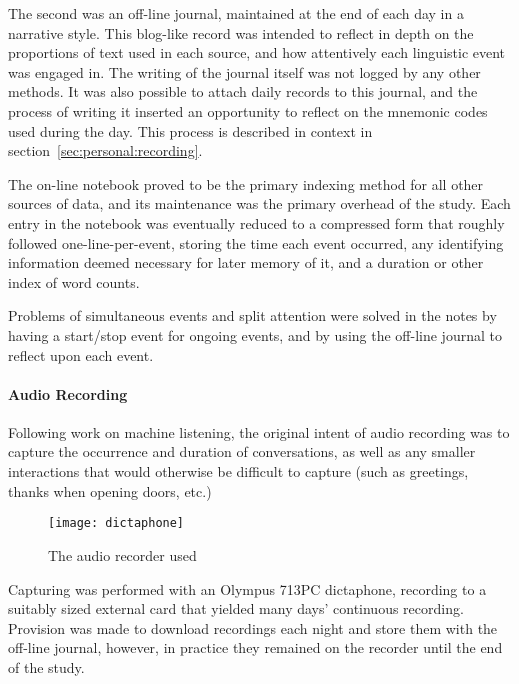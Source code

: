 The second was an off-line journal, maintained at the end of each day in a narrative style.  This blog-like record was intended to reflect in depth on the proportions of text used in each source, and how attentively each linguistic event was engaged in.  The writing of the journal itself was not logged by any other methods.  It was also possible to attach daily records to this journal, and the process of writing it inserted an opportunity to reflect on the mnemonic codes used during the day.  This process is described in context in section~\ref{sec:personal:recording}.

The on-line notebook proved to be the primary indexing method for all other sources of data, and its maintenance was the primary overhead of the study.  Each entry in the notebook was eventually reduced to a compressed form that roughly followed one-line-per-event, storing the time each event occurred, any identifying information deemed necessary for later memory of it, and a duration or other index of word counts.


Problems of simultaneous events and split attention were solved in the notes by having a start/stop event for ongoing events, and by using the off-line journal to reflect upon each event.


\paragraph{Audio Recording}
Following work on machine listening, the original intent of audio recording was to capture the occurrence and duration of conversations, as well as any smaller interactions that would otherwise be difficult to capture (such as greetings, thanks when opening doors, etc.)


\begin{figure}[p]
\centering
\texttt{[image: dictaphone]}
\caption{The audio recorder used}
\label{fig:personal:audiorecorder}
\end{figure}



Capturing was performed with an Olympus 713PC dictaphone, recording to a suitably sized external card that yielded many days' continuous recording.  Provision was made to download recordings each night and store them with the off-line journal, however, in practice they remained on the recorder until the end of the study.


